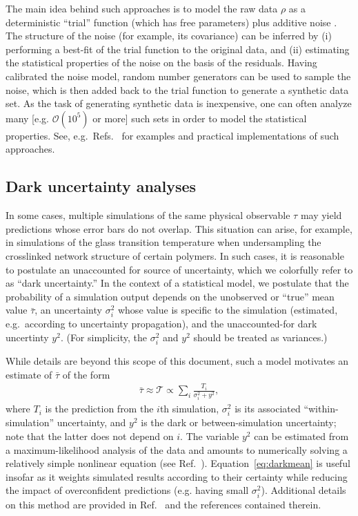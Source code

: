 The main idea behind such approaches is to model the raw data $\rho$ as a deterministic ``trial'' function (which has free parameters) plus additive noise \cite{patrone1,patrone2,patrone3}.  The structure of the noise (for example, its covariance) can be inferred by (i) performing a best-fit of the trial function to the original data, and (ii) estimating the statistical properties of the noise on the basis of the residuals.  Having calibrated the noise model, random number generators can be used to sample the noise, which is then added back to the trial function to generate a synthetic data set.  As the task of generating synthetic data is inexpensive, one can often analyze many [e.g. $\mathcal O(10^5)$ or more] such sets in order to model the statistical properties.  See, e.g.\ Refs.~\cite{patrone1,patrone2,patrone3} for examples and practical implementations of such approaches.  


\subsection{Dark uncertainty analyses}

In some cases, multiple simulations of the same physical observable $\tau$ may yield predictions whose error bars do not overlap.  This situation can arise, for example, in simulations of the glass transition temperature when undersampling the crosslinked network structure of certain polymers.  In such cases, it is reasonable to postulate an unaccounted for source of uncertainty, which we colorfully refer to as ``dark uncertainty.''  In the context of a statistical model, we postulate that the probability of a simulation output depends on the unobserved or ``true'' mean value $\bar \tau$, an uncertainty $\sigma_i^2$ whose value is specific to the simulation (estimated, e.g.\ according to uncertainty propagation), and the unaccounted-for dark uncertinty $y^2$.  (For simplicity, the $\sigma_i^2$ and $y^2$ should be treated as variances.)  

While details are beyond this scope of this document, such a model motivates an estimate of $\bar \tau$ of the form 
\begin{align}
\bar \tau \approx \mathcal T \propto \sum_i \frac{T_i}{\sigma_i^2 + y^2}, \label{eq:darkmean}
\end{align}
where $T_i$ is the prediction from the $i$th simulation, $\sigma_i^2$ is its associated ``within-simulation'' uncertainty, and $y^2$ is the dark or between-simulation uncertainty; note that the latter does not depend on $i$.  The variable $y^2$ can be estimated from a maximum-likelihood analysis of the data and amounts to numerically solving a relatively simple nonlinear equation (see Ref.~\cite{patrone1}).  Equation~\eqref{eq:darkmean} is useful insofar as it weights simulated results according to their certainty while reducing the impact of overconfident predictions (e.g. having small $\sigma_i^2$).  Additional details on this method are provided in Ref.~\cite{patrone1} and the references contained therein.



